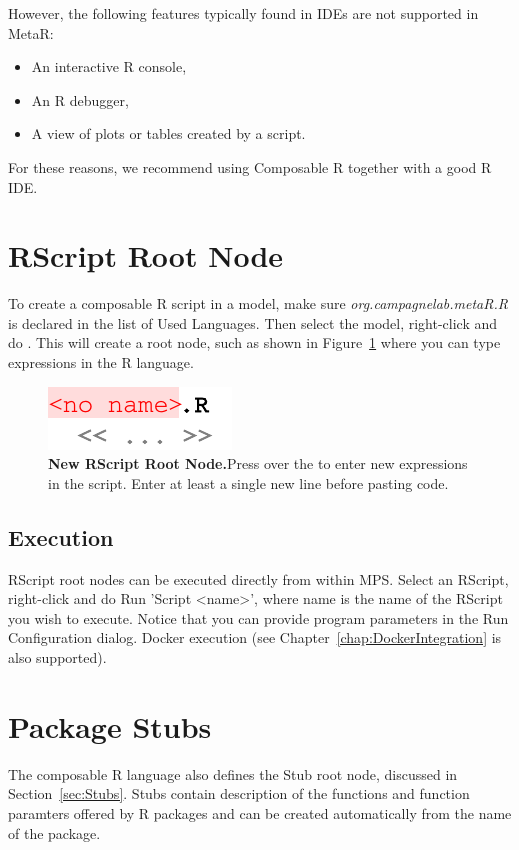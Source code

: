 \noindent{}However, the following features typically found in IDEs are not supported in MetaR:

\begin{itemize}
  \item An interactive R console,
  \item An R debugger,
  \item A view of plots or tables created by a script.
\end{itemize}

For these reasons, we recommend using Composable R together with a good R IDE.

\section{RScript Root Node}
To create a composable R script in a model, make sure \textit{org.campagnelab.metaR.R} is declared in the list of Used Languages. Then select the model, right-click and do . This will create a root node, such as shown in Figure~\ref{fig:NewRScriptRootNode} where you can type expressions in the R language. 

\begin{figure}[h!tbp]
  \centering
  \includegraphics[width=\figWidthTiny]{figures/NewRScriptRootNode.pdf}
\caption[New RScript Root Node]{\textbf{New RScript Root Node.}Press \keys{\return} over the \mpsplaceholder{} to enter new expressions in the script. Enter at least a single new line before pasting code.}
\label{fig:NewRScriptRootNode}
\end{figure}


\subsection{Execution}
RScript root nodes can be executed directly from within MPS. Select an RScript, right-click and do Run 'Script <name>', where name is the name of the RScript you wish to execute. Notice that you can provide program parameters in the Run Configuration dialog. Docker execution (see Chapter~\ref{chap:DockerIntegration} is also supported).

\section{Package Stubs}
The composable R language also defines the Stub root node, discussed in Section~\ref{sec:Stubs}. Stubs contain description of the functions and function paramters offered by R packages and can be created automatically from the name of the package.




